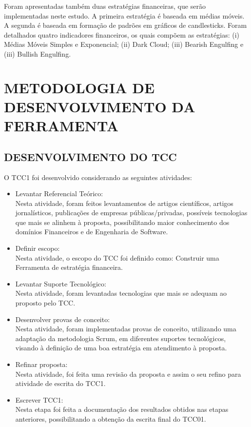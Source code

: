 Foram apresentadas também duas estratégias financeiras, que serão implementadas neste estudo. A primeira estratégia é baseada em médias móveis. A segunda é baseada em formação de padrões em gráficos de candlesticks. Foram detalhados quatro indicadores financeiros, os quais compõem as estratégias: (i) Médias Móveis Simples e Exponencial; (ii) Dark Cloud; (iii) Bearish Engulfing e (iii) Bullish Engulfing.

\newpage
\chapter[METODOLOGIA DE DESENVOLVIMENTO DA FERRAMENTA]{METODOLOGIA DE DESENVOLVIMENTO DA FERRAMENTA}
\section{DESENVOLVIMENTO DO TCC}

O TCC1 foi desenvolvido considerando as seguintes atividades:
\begin{itemize}
\item Levantar Referencial Teórico:\\ Nesta atividade, foram feitos levantamentos de artigos científicos, artigos jornalísticos, publicações de empresas públicas/privadas, possíveis tecnologias que mais se alinhem à proposta, possibilitando maior conhecimento dos domínios Financeiros e de Engenharia de Software.

\item Definir escopo:\\  
Nesta atividade, o escopo do TCC foi definido como: Construir uma Ferramenta de estratégia financeira.
\item Levantar Suporte Tecnológico: \\
 Nesta atividade, foram levantadas tecnologias que mais se adequam ao proposto pelo TCC.
\item Desenvolver provas de conceito:\\ 
Nesta atividade, foram implementadas provas de conceito, utilizando uma adaptação da metodologia Scrum, em diferentes suportes tecnológicos, visando à definição de uma boa estratégia em atendimento à proposta.
\item Refinar proposta: \\
Nesta atividade, foi feita uma revisão da proposta e assim o seu refino para atividade de escrita do TCC1.
\item Escrever TCC1:\\ 
Nesta etapa foi feita a documentação dos resultados obtidos nas etapas anteriores, possibilitando a obtenção da escrita final do TCC01.
\end{itemize}

